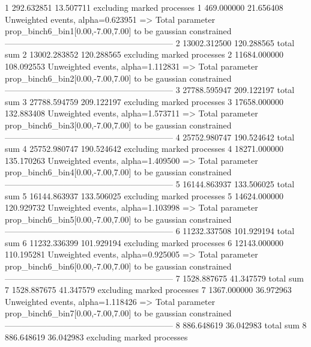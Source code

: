 1          292.632851      13.507711       excluding marked processes    
1          469.000000      21.656408       Unweighted events, alpha=0.623951
  => Total parameter prop_binch6_bin1[0.00,-7.00,7.00] to be gaussian constrained
------------------------------------------------------------
2          13002.312500    120.288565      total sum                     
2          13002.283852    120.288565      excluding marked processes    
2          11684.000000    108.092553      Unweighted events, alpha=1.112831
  => Total parameter prop_binch6_bin2[0.00,-7.00,7.00] to be gaussian constrained
------------------------------------------------------------
3          27788.595947    209.122197      total sum                     
3          27788.594759    209.122197      excluding marked processes    
3          17658.000000    132.883408      Unweighted events, alpha=1.573711
  => Total parameter prop_binch6_bin3[0.00,-7.00,7.00] to be gaussian constrained
------------------------------------------------------------
4          25752.980747    190.524642      total sum                     
4          25752.980747    190.524642      excluding marked processes    
4          18271.000000    135.170263      Unweighted events, alpha=1.409500
  => Total parameter prop_binch6_bin4[0.00,-7.00,7.00] to be gaussian constrained
------------------------------------------------------------
5          16144.863937    133.506025      total sum                     
5          16144.863937    133.506025      excluding marked processes    
5          14624.000000    120.929732      Unweighted events, alpha=1.103998
  => Total parameter prop_binch6_bin5[0.00,-7.00,7.00] to be gaussian constrained
------------------------------------------------------------
6          11232.337508    101.929194      total sum                     
6          11232.336399    101.929194      excluding marked processes    
6          12143.000000    110.195281      Unweighted events, alpha=0.925005
  => Total parameter prop_binch6_bin6[0.00,-7.00,7.00] to be gaussian constrained
------------------------------------------------------------
7          1528.887675     41.347579       total sum                     
7          1528.887675     41.347579       excluding marked processes    
7          1367.000000     36.972963       Unweighted events, alpha=1.118426
  => Total parameter prop_binch6_bin7[0.00,-7.00,7.00] to be gaussian constrained
------------------------------------------------------------
8          886.648619      36.042983       total sum                     
8          886.648619      36.042983       excluding marked processes    
